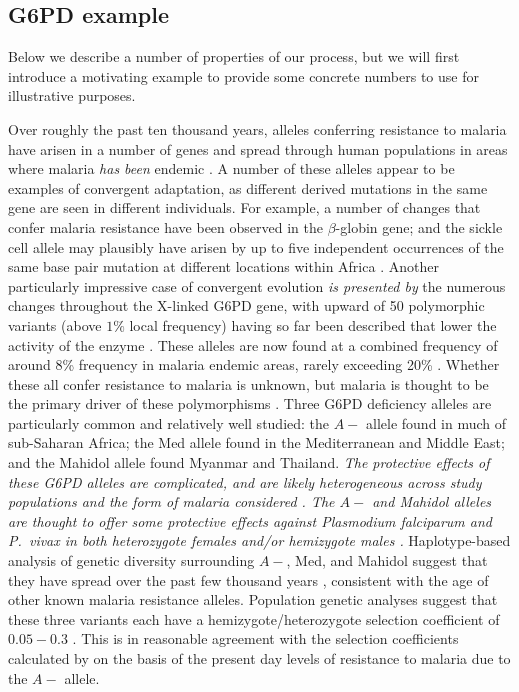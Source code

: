 \documentclass{article}
\newcommand{\mfp}[1]{{\it\color{red}#1}}
\begin{document}

\subsection{G6PD example}

Below we describe a number of properties of our process, but we will first introduce 
a motivating example to provide some concrete
numbers to use for illustrative purposes.

Over roughly the past ten thousand years, alleles conferring resistance to malaria have arisen in a number of genes 
and spread through human populations in areas where malaria \mfp{has been} endemic \citep{Kwiatkowski:05}. 
A number of these alleles appear to be examples of convergent adaptation, 
as different derived mutations in the same gene are seen in different individuals.
For example, 
a number of changes that confer malaria resistance have been observed in the $\beta$-globin gene;
and the sickle cell allele may plausibly have arisen by up to five independent occurrences
of the same base pair mutation at different locations within Africa
\citep{Flint:98,ralphcoop2010}.
Another particularly impressive case of convergent evolution \mfp{is presented by} the numerous changes throughout the X-linked G6PD gene, 
with upward of 50 polymorphic variants (above $1\%$ local frequency) having so far been described 
that lower the activity of the enzyme \citep{Howes-g6pd-variants,Minucci-g6pd}. 
These alleles are now found at a combined frequency of around 8\% frequency in malaria endemic areas,
rarely exceeding 20\% \citep{Howes-g6pd-preval}. 
Whether these all confer resistance to malaria is unknown,
but malaria is thought to be the primary driver of these polymorphisms
\citep[see][ for a general review]{hedrick2011population}.
Three G6PD deficiency alleles are particularly common and relatively well studied: 
the $A-$ allele found in much of sub-Saharan Africa; 
the Med allele found in the Mediterranean and Middle East; 
and the Mahidol allele found Myanmar and Thailand.
\mfp{ 
The protective effects of these G6PD alleles are complicated, and are likely heterogeneous
across study populations and the form of malaria considered
\citep[see ][ for recent discussion]{manjurano_2015, malaria_network_2014}.  
The $A-$ and Mahidol alleles are thought to offer some protective effects against {\it Plasmodium falciparum} and {\it P.\ vivax} in both
heterozygote females and/or hemizygote males \citep{Ruwende-g6pd,
  Louicharoen-g6pd, manjurano_2015}. }
Haplotype-based analysis of genetic diversity surrounding
$A-$, Med, and Mahidol suggest that they have spread over the past 
few thousand years \citep{tishkoff-g6pd,Slatkin-age-est,Saunders-g6pd,Louicharoen-g6pd}, 
consistent with the age of other known malaria resistance alleles. 
Population genetic analyses suggest that these three variants each have a hemizygote/heterozygote 
selection coefficient of $0.05-0.3$
\citep{tishkoff-g6pd,Slatkin-age-est,Saunders-g6pd,Louicharoen-g6pd}. 
This is in reasonable agreement with the selection coefficients calculated by
\citet{Ruwende-g6pd} on the basis of the present day levels of
resistance to malaria due to the $A-$ allele. \\
\end{document}
